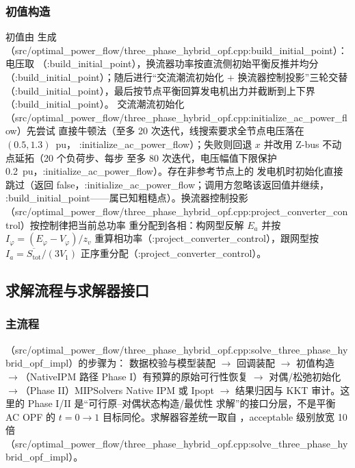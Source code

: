 \subsubsection*{初值构造}
初值由  生成（src/optimal\_power\_flow/three\_phase\_hybrid\_opf.cpp:build\_initial\_point）：电压取
（:build\_initial\_point），换流器功率按直流侧初始平衡反推并均分
（:build\_initial\_point）；随后进行“交流潮流初始化 + 换流器控制投影”三轮交替
（:build\_initial\_point），最后按节点平衡回算发电机出力并截断到上下界（:build\_initial\_point）。
交流潮流初始化 （src/optimal\_power\_flow/three\_phase\_hybrid\_opf.cpp:initialize\_ac\_power\_flow）先尝试
直接牛顿法（至多 20 次迭代，线搜索要求全节点电压落在 $(0.5,1.3)$~pu，
:initialize\_ac\_power\_flow）；失败则回退 $x$ 并改用 Z-bus 不动点延拓（20 个负荷步、每步
至多 80 次迭代，电压幅值下限保护 0.2~pu，:initialize\_ac\_power\_flow）。存在非参考节点上的
发电机时初始化直接跳过（返回 false，:initialize\_ac\_power\_flow；调用方忽略该返回值并继续，
:build\_initial\_point——属已知粗糙点）。换流器控制投影
（src/optimal\_power\_flow/three\_phase\_hybrid\_opf.cpp:project\_converter\_control）按控制律把当前总功率
重分配到各相：构网型反解 $E_a$ 并按 $I_\varphi=(E_\varphi-V_\varphi)/z_v$
重算相功率（:project\_converter\_control），跟网型按 $I_a=\overline{S_{\mathrm{tot}}}/(3V_1)$
正序重分配（:project\_converter\_control）。

\subsection{求解流程与求解器接口}\label{subsec:tp-solve}

\subsubsection*{主流程}
（src/optimal\_power\_flow/three\_phase\_hybrid\_opf.cpp:solve\_three\_phase\_hybrid\_opf\_impl）的步骤为：
数据校验与模型装配 $\to$  回调装配 $\to$ 初值构造
$\to$（NativeIPM 路径 Phase I）有预算的原始可行性恢复
$\to$ 对偶/松弛初始化 $\to$（Phase II）MIPSolvers Native IPM 或 Ipopt
$\to$ 结果归因与 KKT 审计。这里的 Phase I/II 是“可行原--对偶状态构造/最优性
求解”的接口分层，不是平衡 AC OPF 的 $t=0\to1$ 目标同伦。求解器容差统一取自
，acceptable 级别放宽 10 倍（src/optimal\_power\_flow/three\_phase\_hybrid\_opf.cpp:solve\_three\_phase\_hybrid\_opf\_impl）。

